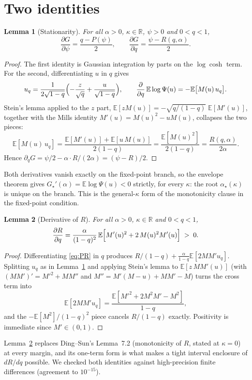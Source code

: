 \documentclass[11pt]{article}
\newtheorem{lemma}{Lemma}
\theoremstyle{remark}
\newcommand{\E}{\mathbb{E}}
\newcommand{\R}{\mathbb{R}}
\begin{document}
\section{Two identities}

\begin{lemma}[Stationarity]\label{lem:stat}
For all $\alpha>0$, $\kappa\in\R$, $\psi>0$ and $0<q<1$,
\[
\frac{\partial G}{\partial\psi}=\frac{q-P(\psi)}{2},
\qquad
\frac{\partial G}{\partial q}=\frac{\psi-R(q,\alpha)}{2}.
\]
\end{lemma}

\begin{proof}
The first identity is Gaussian integration by parts on the
$\log\cosh$ term.  For the second, differentiating $u$ in $q$ gives
\[
u_q=\frac{1}{2\sqrt{1-q}}
\Bigl(-\frac{z}{\sqrt q}+\frac{u}{\sqrt{1-q}}\Bigr),
\qquad
\frac{\partial}{\partial q}\,\E\log\Psi(u)=-\E\bigl[M(u)\,u_q\bigr].
\]
Stein's lemma applied to the $z$ part,
$\E[zM(u)]=-\sqrt{q/(1-q)}\;\E[M'(u)]$, together with the Mills
identity $M'(u)=M(u)^2-uM(u)$, collapses the two pieces:
\[
\E[M(u)\,u_q]
=\frac{\E[M'(u)]+\E[u\,M(u)]}{2(1-q)}
=\frac{\E[M(u)^2]}{2(1-q)}
=\frac{R(q,\alpha)}{2\alpha}.
\]
Hence $\partial_q G=\psi/2-\alpha\cdot R/(2\alpha)=(\psi-R)/2$.
\end{proof}

Both derivatives vanish exactly on the fixed-point branch, so the
envelope theorem gives
$G_\star'(\alpha)=\E\log\Psi(u)<0$ strictly, for every $\kappa$: the
root $\alpha_\star(\kappa)$ is unique on the branch.  This is the
general-$\kappa$ form of the monotonicity clause in the fixed-point
condition.

\begin{lemma}[Derivative of $R$]\label{lem:dR}
For all $\alpha>0$, $\kappa\in\R$ and $0<q<1$,
\[
\frac{\partial R}{\partial q}
=\frac{\alpha}{(1-q)^2}\,
\E\Bigl[M'(u)^2+2\,M(u)^2M'(u)\Bigr]\;>\;0 .
\]
\end{lemma}

\begin{proof}
Differentiating \eqref{eq:PR} in $q$ produces
$R/(1-q)+\tfrac{\alpha}{1-q}\E[2MM'u_q]$.  Splitting $u_q$ as in
Lemma~\ref{lem:stat} and applying Stein's lemma to
$\E[z\,MM'(u)]$ (with $(MM')'=M'^2+MM''$ and
$M''=M'(M-u)+MM'-M$) turns the cross term into
\[
\E[2MM'u_q]=\frac{\E[M'^2+2M^2M'-M^2]}{1-q},
\]
and the $-\E[M^2]/(1-q)^2$ piece cancels $R/(1-q)$ exactly.
Positivity is immediate since $M'\in(0,1)$.
\end{proof}

Lemma~\ref{lem:dR} replaces Ding--Sun's Lemma~7.2 (monotonicity of
$R$, stated at $\kappa=0$) at every margin, and its one-term form is
what makes a tight interval enclosure of $dR/dq$ possible.  We checked
both identities against high-precision finite differences (agreement
to $10^{-15}$).
\end{document}
